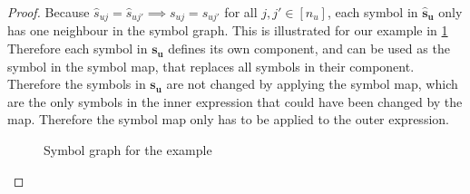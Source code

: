 \begin{proof}
    \small
    Because $\hat{s}_{uj} = \hat{s}_{uj'} \implies s_{uj} = s_{uj'}$ for all $j, j' \in [n_u]$,
    each symbol in $\bm{\hat{s}_u}$ only has one neighbour in the symbol graph.
    This is illustrated for our example in \cref{fig:nested_expressions:example_symbol_graph_remove}
    Therefore each symbol in $\bm{s_u}$ defines its own component,
    and can be used as the symbol in the symbol map, that replaces all symbols in their component.
    Therefore the symbols in $\bm{s_u}$ are not changed by applying the symbol map, which are the only symbols in the inner expression that could have been changed by the map.
    Therefore the symbol map only has to be applied to the outer expression.

    \begin{figure}[h]
        \centering
        \caption{Symbol graph for the example}
        \label{fig:nested_expressions:example_symbol_graph_remove}
    \end{figure}
\end{proof}
\bigskip